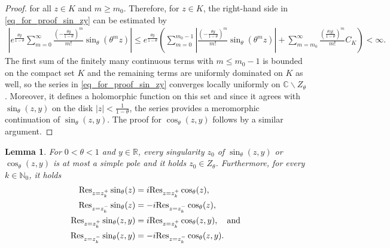 \documentclass[10pt,a4paper]{amsart}
\newcommand{\N}{\mathbb{N}} %
\newcommand{\R}{\mathbb{R}} %
\newcommand{\C}{\mathbb{C}} %
\newcommand{\1}{\mathds{1}}
\newtheorem{Lemma}[definition]{Lemma}
\begin{document}
\begin{proof}
for all $z\in K$ and $m\ge m_0$. Therefore, for $z\in K$, the right-hand side in \eqref{eq_for_proof_sin_zy} can be estimated by
\begin{align*}
    \left|e^{\frac{\theta y}{1-\theta}}\sum_{m=0}^\infty\frac{\left(-\frac{\theta y}{1-\theta}\right)^m}{m!}\sin_\theta(\theta^m z)\right|
    \!\le\! e^{\frac{\theta y}{1-\theta}}\!\left(\sum_{m=0}^{m_0-1}\left|\frac{\left(-\frac{\theta y}{1-\theta}\right)^m}{m!}\sin_\theta(\theta^m z)\right|\!+\!\!\!\sum_{m=m_0}^\infty\!\!\frac{\left(\frac{\theta |y|}{1-\theta}\right)^m}{m!}C_K\right)\!<\!\infty.
\end{align*}
The first sum of the finitely many continuous terms with $m\le m_0-1$ is bounded on the compact set $K$ and the remaining terms are uniformly dominated on $K$ as well, so the series in \eqref{eq_for_proof_sin_zy} converges locally uniformly on $\C\backslash Z_\theta$. Moreover, it defines a holomorphic function on this set and since it agrees with $ \sin_\theta(z,y)$ on the disk $|z|<\frac{1}{1-\theta}$, the series provides a meromorphic continuation of $ \sin_\theta(z,y)$.
The proof for $\cos_\theta(z,y)$ follows by a similar argument.
 \end{proof}
 \begin{Lemma}\label{residue_sin_cos_prelim}
   For $0<\theta<1$ and $y\in\R$, every singularity $z_0$ of 
   $\sin_\theta(z,y)$ or $\cos_\theta(z,y)$ is at most a simple pole and it holds $z_0\in Z_\theta$. Furthermore, for every $k\in\N_0$, it holds
   \begin{align}
   \mathrm{Res}_{z=z_k^+}\sin_\theta(z)&= i\mathrm{Res}_{z=z_k^+}\cos_\theta(z),\label{Res_sin_cos_pos}
   \\\mathrm{Res}_{z=z_k^-}\sin_\theta(z)&= -i\mathrm{Res}_{z=z_k^-}\cos_\theta(z),\label{Res_sin_cos_neg}
      \\ \mathrm{Res}_{z=z_k^+}\sin_\theta(z,y)&= i\mathrm{Res}_{z=z_k^+}\cos_\theta(z,y),\quad\text{and}\notag
       \\ \mathrm{Res}_{z=z_k^-}\sin_\theta(z,y)&=-i \mathrm{Res}_{z=z_k^-}\cos_\theta(z,y).\notag
   \end{align}
 \end{Lemma}
\end{document}
